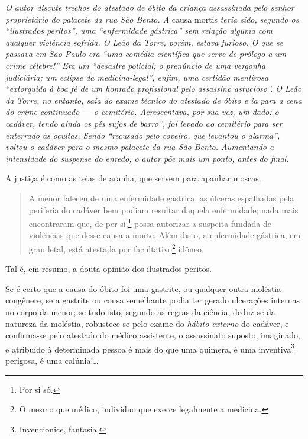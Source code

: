 \begin{resumo}
\emph{O autor discute trechos do atestado de óbito da criança
assassinada pelo senhor proprietário do palacete da rua São Bento. A}
causa mortis \emph{teria sido, segundo os ``ilustrados peritos'', uma
``enfermidade gástrica'' sem relação alguma com qualquer violência
sofrida. O Leão da Torre, porém, estava furioso. O que se passava
em São Paulo era ``uma comédia científica que serve de prólogo a um crime
célebre!'' Era um ``desastre policial; o prenúncio de uma vergonha
judiciária; um eclipse da medicina-legal'', enfim, uma certidão mentirosa
``extorquida à boa fé de um honrado profissional pelo assassino
astucioso''. O Leão da Torre, no entanto, saía do exame técnico do
atestado de óbito e ia para a cena do crime continuado --- o cemitério.
Acrescentava, por sua vez, um dado: o cadáver, tendo ainda os pés sujos
de barro'', foi levado ao cemitério para ser enterrado às ocultas. Sendo
``recusado pelo coveiro, que levantou o alarma'', voltou o cadáver para o
mesmo palacete da rua São Bento. Aumentando a intensidade do suspense do
enredo, o autor põe mais um ponto, antes do final.}
\end{resumo}

\epigraph{A justiça é como as teias de aranha, que servem para apanhar
moscas.\footnotemark}{}

\begin{quote}
A menor faleceu de uma enfermidade gástrica; as úlceras espalhadas pela
periferia do cadáver bem podiam resultar daquela enfermidade; nada mais
encontraram que, de per si,\footnote{Por si só.} possa autorizar a
suspeita fundada de violências que desse causa a morte. Além disto, a
enfermidade gástrica, em grau letal, está atestada por
facultativo\footnote{O mesmo que médico, indivíduo que exerce
  legalmente a medicina.} idôneo.
\end{quote}  

Tal é, em resumo, a douta opinião dos ilustrados peritos.

Se é certo que a causa do óbito foi uma gastrite, ou qualquer outra
moléstia congênere, se a gastrite ou cousa semelhante podia ter gerado
ulcerações internas no corpo da menor; se tudo isto, segundo as regras
da ciência, deduz-se da natureza da moléstia, robustece-se pelo exame do
\emph{hábito externo} do cadáver, e confirma-se pelo atestado do médico
assistente, o assassinato suposto, imaginado, e atribuído à determinada
pessoa é mais do que uma quimera, é uma inventiva\footnote{
  Invencionice, fantasia.} perigosa, é uma calúnia!\ldots{}

